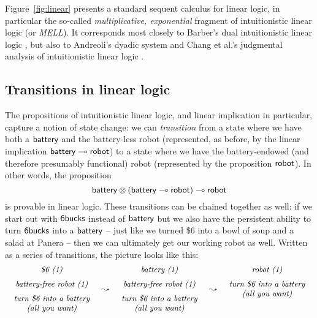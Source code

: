 

Figure~\ref{fig:linear} presents a standard sequent calculus for
linear logic, in particular the so-called {\it multiplicative,
  exponential} fragment of intuitionistic linear logic (or {\it
  MELL}). It corresponds most closely to Barber's dual intuitionistic
linear logic \cite{barber96dual}, but also to Andreoli's dyadic system
\cite{andreoli92logic} and Chang et al.'s judgmental analysis of
intuitionistic linear logic \cite{chang03judgmental}.

\subsection*{Transitions in linear logic}

The propositions of intuitionistic linear logic, and linear implication
in particular, capture a notion of state change: we can {\it
  transition} from a state where we have both a ${\sf battery}$ and
the battery-less robot (represented, as before, by the linear
implication ${\sf battery} \multimap {\sf robot}$) to a state where we
have the battery-endowed (and therefore presumably functional) robot
(represented by the proposition ${\sf robot}$). In other words, the
proposition
%
\[{\sf battery} \otimes ({\sf battery} \multimap {\sf robot}) \multimap
{\sf robot}\] 
%
is provable in linear logic. These transitions can be chained
together as well: if we start out with ${\sf
  6bucks}$ instead of ${\sf battery}$ but we also have the
persistent ability to turn ${\sf 6bucks}$ into a ${\sf battery}$ --
just like we turned \$6 into a bowl of soup and a salad at Panera --
then we can ultimately get our working robot as well.
Written as a series of transitions, the picture looks like this:
\[
\begin{array}{ccccc}
\begin{array}{c}
\mbox{\it \$6 (1)}\medskip\\ 
\mbox{\it battery-free robot (1)} \medskip\\ 
\mbox{\it turn \$6 into a battery}\\
\mbox{\it (all you want)}
\end{array}
& \leadsto &
\begin{array}{c}
\mbox{\it battery  (1)}\medskip\\ 
\mbox{\it battery-free robot (1)} \medskip\\ 
\mbox{\it turn \$6 into a battery}\\
\mbox{\it (all you want)}
\end{array}
& \leadsto &
\begin{array}{c}
\mbox{\it robot (1)} \medskip\\ 
\mbox{\it turn \$6 into a battery}\\
\mbox{\it (all you want)}\medskip\\~\\
\end{array}
\end{array}
\]
